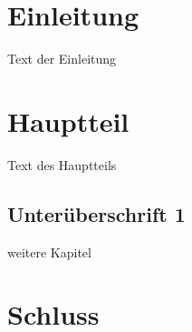 \documentclass[a4paper, 12pt]{article}
\begin{document}

\setcounter{page}{1}

\section{Einleitung} \label{einleitung}

Text der Einleitung

\section{Hauptteil}

Text des Hauptteils

\subsection{Unterüberschrift 1}

weitere Kapitel

\section{Schluss}


\newpage

\end{document}
